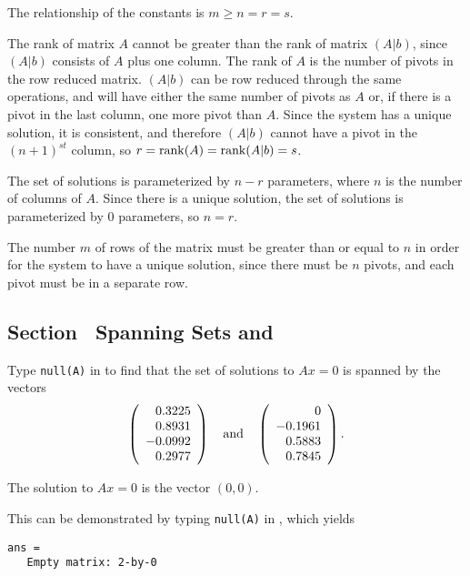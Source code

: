 \ans The relationship of the constants is $m \geq n = r = s$.

\soln The rank of matrix $A$ cannot be greater than the rank of matrix
$(A|b)$, since $(A|b)$ consists of $A$ plus one column.  The rank of $A$
is the number of pivots in the row reduced matrix.  $(A|b)$ can be row 
reduced through the same operations, and will have either the same number
of pivots as $A$ or, if there is a pivot in the last column, one more
pivot than $A$.  Since the system has a unique solution, it is consistent,
and therefore $(A|b)$ cannot have a pivot in the $(n + 1)^{st}$ column, so
$r = {\rm rank}(A) = {\rm rank}(A|b) = s$.

\para The set of solutions is parameterized by $n - r$ parameters,
where $n$ is the number of columns of $A$.  Since there is a unique
solution, the set of solutions is parameterized by $0$ parameters,
so $n = r$.

\para The number $m$ of rows of the matrix must be greater than or
equal to $n$ in order for the system to have a unique solution, since
there must be $n$ pivots, and each pivot must be in a separate row.


\subsection*{Section~\protect{\ref{S:5.3}} Spanning Sets and \Matlab}

Type {\tt null(A)} in \Matlab to find that the set of solutions to
$Ax = 0$ is spanned by the vectors
\[
\left(\begin{array}{r} 0.3225 \\ 0.8931 \\ -0.0992 \\ 0.2977
\end{array}\right) \quad\mbox{and}\quad \left(\begin{array}{r} 0 \\ -0.1961 \\
0.5883 \\ 0.7845 \end{array}\right).
\]

 \ans The solution to $Ax = 0$ is the vector $(0,0).$

\soln This can be demonstrated by typing {\tt null(A)} in \Matlab, which
yields
\begin{verbatim}
ans =
   Empty matrix: 2-by-0
\end{verbatim}


